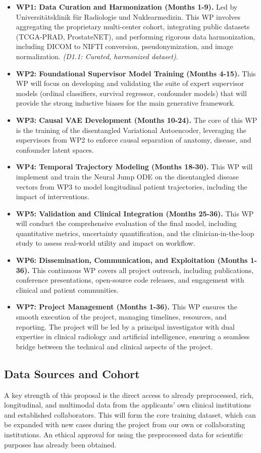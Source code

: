 \documentclass[11pt, a4paper]{article}
\begin{document}
\begin{itemize}
    \item \textbf{WP1: Data Curation and Harmonization (Months 1-9).} Led by Universitätsklinik für Radiologie und Nuklearmedizin. This WP involves aggregating the proprietary multi-center cohort, integrating public datasets (TCGA-PRAD, ProstateNET), and performing rigorous data harmonization, including DICOM to NIFTI conversion, pseudonymization, and image normalization. \textit{(D1.1: Curated, harmonized dataset)}.
    \item \textbf{WP2: Foundational Supervisor Model Training (Months 4-15).} This WP will focus on developing and validating the suite of expert supervisor models (ordinal classifiers, survival regressor, confounder models) that will provide the strong inductive biases for the main generative framework.
    \item \textbf{WP3: Causal VAE Development (Months 10-24).} The core of this WP is the training of the disentangled Variational Autoencoder, leveraging the supervisors from WP2 to enforce causal separation of anatomy, disease, and confounder latent spaces.
    \item \textbf{WP4: Temporal Trajectory Modeling (Months 18-30).} This WP will implement and train the Neural Jump ODE on the disentangled disease vectors from WP3 to model longitudinal patient trajectories, including the impact of interventions.
    \item \textbf{WP5: Validation and Clinical Integration (Months 25-36).} This WP will conduct the comprehensive evaluation of the final model, including quantitative metrics, uncertainty quantification, and the clinician-in-the-loop study to assess real-world utility and impact on workflow.
    \item \textbf{WP6: Dissemination, Communication, and Exploitation (Months 1-36).} This continuous WP covers all project outreach, including publications, conference presentations, open-source code releases, and engagement with clinical and patient communities.
    \item \textbf{WP7: Project Management (Months 1-36).} This WP ensures the smooth execution of the project, managing timelines, resources, and reporting. The project will be led by a principal investigator with dual expertise in clinical radiology and artificial intelligence, ensuring a seamless bridge between the technical and clinical aspects of the project.
\end{itemize}

\subsection{Data Sources and Cohort}
A key strength of this proposal is the direct access to already preprocessed, rich, longitudinal, and multimodal data from the applicants’ own clinical institutions and established collaborators. This will form the core training dataset, which can be expanded with new cases during the project from our own or collaborating institutions. An ethical approval for using the preprocessed data for scientific purposes has already been obtained.
\end{document}
